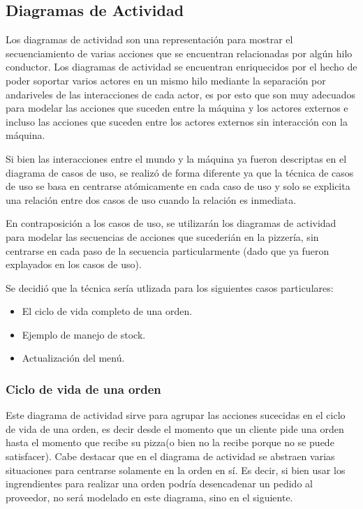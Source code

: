 \documentclass[a4paper,10pt]{article}
\begin{document}
\newpage

\subsection*{Diagramas de Actividad}


Los diagramas de actividad son una representaci\'on para mostrar el secuenciamiento de varias acciones que se encuentran relacionadas por alg\'un
hilo conductor. Los diagramas de actividad se encuentran enriquecidos por el hecho de poder soportar varios actores en un mismo hilo mediante la 
separaci\'on por andariveles de las interacciones de cada actor, es por esto que son muy adecuados para modelar las acciones que suceden entre la
m\'aquina y los actores externos e incluso las acciones que suceden entre los actores externos sin interacci\'on con la m\'aquina.

Si bien las interacciones entre el mundo y la m\'aquina ya fueron descriptas en el diagrama de casos de uso, se realiz\'o de forma diferente
ya que la t\'ecnica de casos de uso se basa en centrarse at\'omicamente en cada caso de uso y solo se explicita una relaci\'on entre dos casos de
uso cuando la relaci\'on es inmediata.

En contraposici\'on a los casos de uso, se utilizar\'an los diagramas de actividad para modelar las secuencias de acciones que sucederi\'an en la 
pizzer\'ia, sin centrarse en cada paso de la secuencia particularmente (dado que ya fueron explayados en los casos de uso).

Se decidi\'o que la t\'ecnica ser\'ia utlizada para los siguientes casos particulares:

\begin{itemize}
\item El ciclo de vida completo de una orden.
\item Ejemplo de manejo de stock.
\item Actualizaci\'on del men\'u.
\end{itemize}


\subsubsection*{Ciclo de vida de una orden}

Este diagrama de actividad sirve para agrupar las acciones sucecidas en el ciclo de vida de una orden, es decir desde el momento que un cliente
pide una orden hasta el momento que recibe su pizza(o bien no la recibe porque no se puede satisfacer). Cabe destacar que en el diagrama de actividad
se abstraen varias situaciones para centrarse solamente en la orden en s\'i. Es decir, si bien usar los ingrendientes para realizar una orden podr\'ia
desencadenar un pedido al proveedor, no ser\'a modelado en este diagrama, sino en el siguiente.
\end{document}
